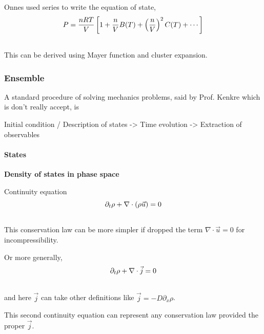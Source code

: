 \documentclass[letterpaper,10pt,english]{sphinxmanual}
\begin{document}
Onnes used series to write the equation of state,
\begin{gather}
\begin{split}P = \frac{n R T}{V} \left[ 1 + \frac{n}{V} B(T) + \left(\frac{n}{V}\right)^2 C(T) + \cdots \right]\end{split}\notag\\\begin{split}\end{split}\notag
\end{gather}
This can be derived using Mayer function and cluster expansion.


\subsubsection{Ensemble}
\label{equilibrium/week4:ensemble}
A standard procedure of solving mechanics problems, said by Prof. Kenkre which is don't really accept, is

Initial condition / Description of states -\textgreater{} Time evolution -\textgreater{} Extraction of observables


\paragraph{States}
\label{equilibrium/week4:states}
\textbf{Density of states in phase space}

Continuity equation
\begin{gather}
\begin{split}\partial _ t \rho + \nabla \cdot (\rho \vec u) =0\end{split}\notag\\\begin{split}\end{split}\notag
\end{gather}
This conservation law can be more simpler if dropped the term $\nabla\cdot \vec u = 0$ for incompressibility.

Or more generally,
\begin{gather}
\begin{split}\partial _ t \rho + \nabla \cdot \vec j = 0\end{split}\notag\\\begin{split}\end{split}\notag
\end{gather}
and here $\vec j$ can take other definitions like $\vec j = - D \partial_x \rho$.

This second continuity equation can represent any conservation law provided the proper $\vec j$.
\end{document}
